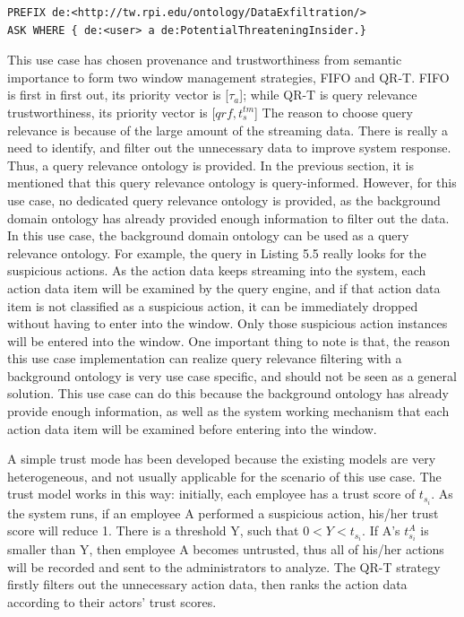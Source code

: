 \begin{lstlisting}[language=SPARQL, caption={Potential Malicious Insider Query},basicstyle=\small,frame=single]
PREFIX de:<http://tw.rpi.edu/ontology/DataExfiltration/>
ASK WHERE { de:<user> a de:PotentialThreateningInsider.}
\end{lstlisting}

This use case has chosen provenance and trustworthiness from semantic importance to form two window management strategies, FIFO and QR-T. 
FIFO is first in first out, its priority vector is [$\tau_{a}$]; 
while QR-T is query relevance trustworthiness, its priority vector is [$qrf, t^{tm}_{s}$]
The reason to choose query relevance is because of the large amount of the streaming data. 
There is really a need to identify, and filter out the unnecessary data to improve system response. 
Thus, a query relevance ontology is provided. 
In the previous section, it is mentioned that this query relevance ontology is query-informed.
However, for this use case, no dedicated query relevance ontology is provided, as the background domain ontology has already provided enough information to filter out the data. 
In this use case, the background domain ontology can be used as a query relevance ontology. 
For example, the query in Listing 5.5 really looks for the suspicious actions. 
As the action data keeps streaming into the system, each action data item will be examined by the query engine, and if that action data item is not classified as a suspicious action, it can be immediately dropped without having to enter into the window.
Only those suspicious action instances will be entered into the window. 
One important thing to note is that, the reason this use case implementation can realize query relevance filtering with a background ontology is very use case specific, and should not be seen as a general solution. 
This use case can do this because the background ontology has already provide enough information, as well as the system working mechanism that each action data item will be examined before entering into the window. 

A simple trust mode has been developed because the existing models are very heterogeneous, and not usually applicable for the scenario of this use case. 
The trust model works in this way: 
initially, each employee has a trust score of $t_{s_i}$. 
As the system runs, if an employee A performed a suspicious action, his/her trust score will reduce 1. 
There is a threshold Y, such that $0 < Y < t_{s_i}$. 
If A's $t^{A}_{s_i}$ is smaller than Y, then  employee A becomes untrusted, thus all of his/her actions will be recorded and sent to the administrators to analyze. 
The QR-T strategy firstly filters out the unnecessary action data, then ranks the action data according to their actors' trust scores. 
%

